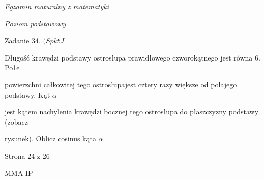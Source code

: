 \documentclass[a4paper,12pt]{article}
\begin{document}
{\it Egzamin maturalny z matematyki}

{\it Poziom podstawowy}

Zadanie 34. $(SpktJ$

Długość krawędzi podstawy ostrosłupa prawidłowego czworokątnego jest równa 6. Po1e

powierzchni całkowitej tego ostrosłupajest cztery razy większe od polajego podstawy. Kąt $\alpha$

jest kątem nachylenia krawędzi bocznej tego ostrosłupa do płaszczyzny podstawy (zobacz

rysunek). Oblicz cosinus kąta $\alpha.$

Strona 24 z 26

MMA-IP
\end{document}
